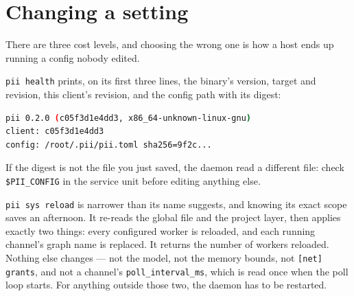 \section{Changing a setting}

There are three cost levels, and choosing the wrong one is how a host ends up running a
config nobody edited.

\begin{center}
\begin{minipage}{\linewidth}
\centering
{}
\end{minipage}
\end{center}

\texttt{pii health} prints, on its first three lines, the binary's version, target and
revision, this client's revision, and the config path with its digest:

\begin{lstlisting}[language=bash]
pii 0.2.0 (c05f3d1e4dd3, x86_64-unknown-linux-gnu)
client: c05f3d1e4dd3
config: /root/.pii/pii.toml sha256=9f2c...
\end{lstlisting}

If the digest is not the file you just saved, the daemon read a different file: check
\texttt{\$PII\_CONFIG} in the service unit before editing anything else.

\texttt{pii sys reload} is narrower than its name suggests, and knowing its exact scope saves
an afternoon. It re-reads the global file and the project layer, then applies exactly two
things: every configured worker is reloaded, and each running channel's graph name is
replaced. It returns the number of workers reloaded. Nothing else changes --- not the model,
not the memory bounds, not \texttt{[net] grants}, and not a channel's
\texttt{poll\_interval\_ms}, which is read once when the poll loop starts. For anything
outside those two, the daemon has to be restarted.

